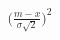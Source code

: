 \documentclass[preview]{standalone}
\begin{document}
\begin{align*}
\Big( \frac{m - x}{\sigma \sqrt{2}} \Big)^2
\end{align*}
\end{document}
